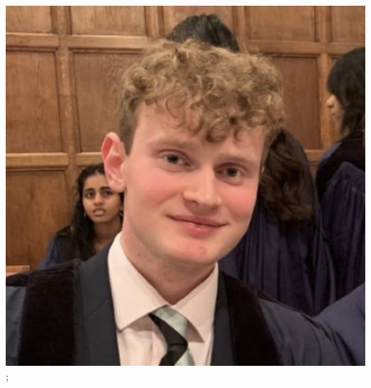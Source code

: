 \documentclass[aspectratio=169]{beamer}
\begin{document}
\begin{frame}
{        \includegraphics[width=0.06\textheight]{people/will_templeton.jpg}%
    };
\end{frame}
\end{document}
